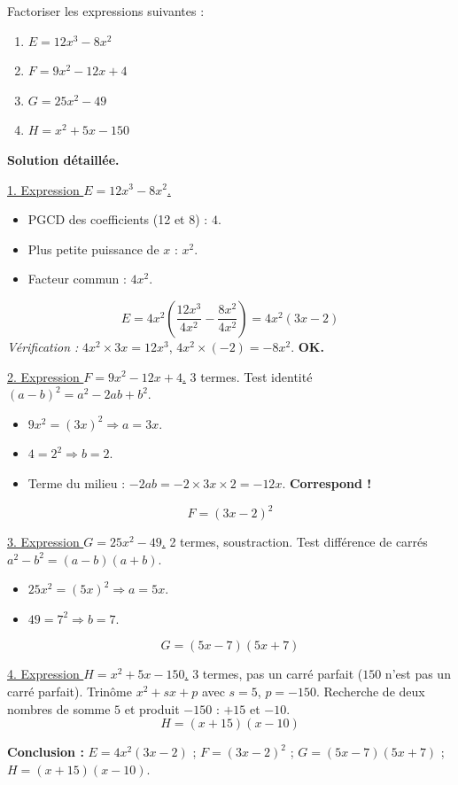 \documentclass[11pt]{article}
\begin{document}
\begin{exoresolu}
Factoriser les expressions suivantes :
\begin{enumerate}
    \item $E = 12x^3 - 8x^2$
    \item $F = 9x^2 - 12x + 4$
    \item $G = 25x^2 - 49$
    \item $H = x^2 + 5x - 150$
\end{enumerate}
\tcblower
\textbf{Solution détaillée.}

\underline{1. Expression $E = 12x^3 - 8x^2$.}
\begin{itemize}
    \item PGCD des coefficients (12 et 8) : $4$.
    \item Plus petite puissance de $x$ : $x^2$.
    \item Facteur commun : $4x^2$.
\end{itemize}
\[ E = 4x^2 \left( \frac{12x^3}{4x^2} - \frac{8x^2}{4x^2} \right) = 4x^2 (3x - 2) \]
\textit{Vérification :} $4x^2 \times 3x = 12x^3$, $4x^2 \times (-2) = -8x^2$. \textbf{OK.}

\underline{2. Expression $F = 9x^2 - 12x + 4$.}
3 termes. Test identité $(a-b)^2 = a^2 - 2ab + b^2$.
\begin{itemize}
    \item $9x^2 = (3x)^2 \Rightarrow a = 3x$.
    \item $4 = 2^2 \Rightarrow b = 2$.
    \item Terme du milieu : $-2ab = -2 \times 3x \times 2 = -12x$. \textbf{Correspond !}
\end{itemize}
\[ F = (3x - 2)^2 \]

\underline{3. Expression $G = 25x^2 - 49$.}
2 termes, soustraction. Test différence de carrés $a^2 - b^2 = (a-b)(a+b)$.
\begin{itemize}
    \item $25x^2 = (5x)^2 \Rightarrow a = 5x$.
    \item $49 = 7^2 \Rightarrow b = 7$.
\end{itemize}
\[ G = (5x - 7)(5x + 7) \]

\underline{4. Expression $H = x^2 + 5x - 150$.}
3 termes, pas un carré parfait ($150$ n'est pas un carré parfait). Trinôme $x^2 + sx + p$ avec $s=5$, $p=-150$.
Recherche de deux nombres de somme $5$ et produit $-150$ : $+15$ et $-10$.
\[ H = (x + 15)(x - 10) \]

\textbf{Conclusion :} $E = 4x^2(3x-2)$ ; $F = (3x-2)^2$ ; $G = (5x-7)(5x+7)$ ; $H = (x+15)(x-10)$.
\end{exoresolu}
\end{document}
